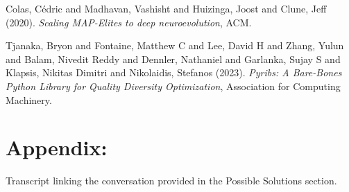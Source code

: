 \documentclass[11pt]{article}
\begin{document}
\noindent
Colas, Cédric and Madhavan, Vashisht and Huizinga, Joost and Clune, Jeff (2020). \emph{Scaling MAP-Elites to deep neuroevolution}, ACM.

\noindent
Tjanaka, Bryon and Fontaine, Matthew C and Lee, David H and Zhang, Yulun and Balam, Nivedit Reddy and Dennler, Nathaniel and Garlanka, Sujay S and Klapsis, Nikitas Dimitri and Nikolaidis, Stefanos (2023). \emph{Pyribs: A Bare-Bones Python Library for Quality Diversity Optimization}, Association for Computing Machinery.

\section{Appendix:}
\label{sec:orge017015}

Transcript linking the conversation provided in the Possible Solutions section.
\end{document}
